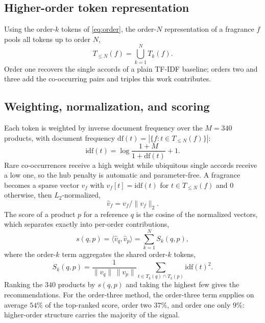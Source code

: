 \documentclass[conference]{IEEEtran}
\begin{document}
\subsection{Higher-order token representation}
Using the order-$k$ tokens of \eqref{eq:order}, the order-$N$ representation of a fragrance
$f$ pools all tokens up to order $N$,
\begin{equation}
T_{\le N}(f)=\bigcup_{k=1}^{N} T_k(f). \label{eq:tokens}
\end{equation}
Order one recovers the single accords of a plain TF-IDF baseline; orders two and three add the
co-occurring pairs and triples this work contributes.

\subsection{Weighting, normalization, and scoring}
Each token is weighted by inverse document frequency over the $M=340$ products, with document
frequency $\mathrm{df}(t)=|\{f:t\in T_{\le N}(f)\}|$:
\begin{equation}
\mathrm{idf}(t)=\log\frac{1+M}{1+\mathrm{df}(t)}+1. \label{eq:idf}
\end{equation}
Rare co-occurrences receive a high weight while ubiquitous single accords receive a low one, so
the hub penalty is automatic and parameter-free. A fragrance becomes a sparse vector $v_f$ with
$v_f[t]=\mathrm{idf}(t)$ for $t\in T_{\le N}(f)$ and $0$ otherwise, then $L_2$-normalized,
\begin{equation}
\hat v_f = v_f/\lVert v_f\rVert_2. \label{eq:vector}
\end{equation}
The score of a product $p$ for a reference $q$ is the cosine of the normalized vectors, which
separates exactly into per-order contributions,
\begin{equation}
s(q,p)=\langle \hat v_q,\hat v_p\rangle=\sum_{k=1}^{N} S_k(q,p), \label{eq:score}
\end{equation}
where the order-$k$ term aggregates the shared order-$k$ tokens,
\begin{equation}
S_k(q,p)=\frac{1}{\lVert v_q\rVert\,\lVert v_p\rVert}\sum_{t\in T_k(q)\cap T_k(p)}\mathrm{idf}(t)^2. \label{eq:terms}
\end{equation}
Ranking the $340$ products by $s(q,p)$ and taking the highest few gives the recommendations.
For the order-three method, the order-three term supplies on average $54\%$ of the top-ranked
score, order two $37\%$, and order one only $9\%$: higher-order structure carries the majority
of the signal.
\end{document}

